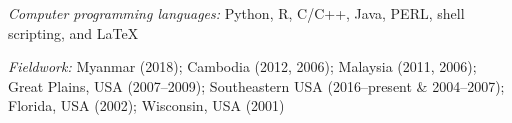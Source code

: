 \myHangIndent
{\sffamily\itshape Computer programming languages:} Python, R, C/C++, Java,
PERL, shell scripting, and \LaTeX

\myHangIndent
{\sffamily\itshape Fieldwork:} Myanmar (2018); Cambodia (2012, 2006); Malaysia (2011, 2006);
Great Plains, USA (2007--2009); Southeastern USA (2016--present \& 2004--2007); Florida, USA
(2002); Wisconsin, USA (2001)
